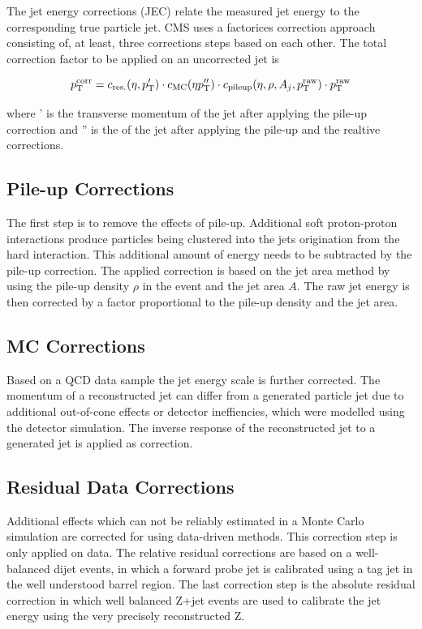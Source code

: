 The jet energy corrections (JEC) relate the measured jet energy to the
corresponding true particle jet. CMS uses a factorices correction approach
consisting of, at least, three corrections steps based on each other. The total
correction factor to be applied on an uncorrected jet is

\begin{equation}
    p_{\mathrm{T}}^{\mathrm{corr}} = c_{\mathrm{res.}} (\eta, p_{\mathrm{T}}') \cdot c_{\mathrm{MC}}
    (\eta p_{\mathrm{T}}'') \cdot c_{\mathrm{pileup}}(\eta, \rho, A_j, p_{\mathrm{T}}^{\mathrm{raw}}) \cdot p_{\mathrm{T}}^{\mathrm{raw}} 
\end{equation}

where \pt' is the transverse momentum of the jet after applying the pile-up
correction and \pt'' is the \pt of the jet after applying the pile-up and the
realtive corrections.

\subsection{Pile-up Corrections}

The first step is to remove the effects of pile-up. Additional soft proton-proton
interactions produce particles being clustered into the jets origination from
the hard interaction. This additional amount of energy needs to be subtracted by
the pile-up correction. The applied correction is based on the jet area method
by using the pile-up density $\rho$ in the event and the jet area $A$. The raw
jet energy is then corrected by a factor proportional to the pile-up density and
the jet area.

\subsection{MC Corrections}

Based on a QCD data sample the jet energy scale is further corrected. The
momentum of a reconstructed jet can differ from a generated particle jet due to
additional out-of-cone effects or detector ineffiencies, which were modelled
using the detector simulation. The inverse response of the reconstructed jet to
a generated jet is applied as correction.

\subsection{Residual Data Corrections}

Additional effects which can not be reliably estimated in a Monte Carlo
simulation are corrected for using data-driven methods. This correction step is
only applied on data. The relative residual corrections are based on a
well-balanced dijet events, in which a forward probe jet is calibrated using a
tag jet in the well understood barrel region. The last correction step is the
absolute residual correction in which well balanced Z+jet events are used to
calibrate the jet energy using the very precisely reconstructed Z.
